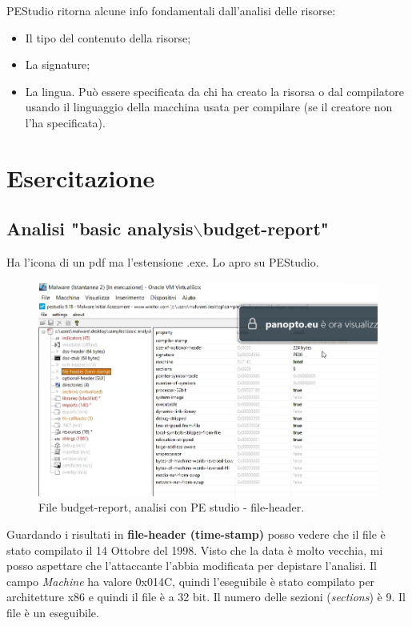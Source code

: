 \documentclass[a4paper]{book}
\begin{document}
PEStudio ritorna alcune info fondamentali dall'analisi delle risorse:
\begin{itemize}
    \item Il tipo del contenuto della risorse;
    \item La signature;
    \item La lingua. Può essere specificata da chi ha creato la risorsa o dal compilatore usando il linguaggio della macchina usata per compilare (se il creatore non l'ha specificata).
\end{itemize}

\section{Esercitazione}

\subsection{Analisi "basic analysis$\backslash$budget-report"}

Ha l'icona di un pdf ma l'estensione .exe. Lo apro su PEStudio.

\begin{figure}[p]
    \includegraphics[width=1\textwidth]{images/13-10/2.png}
    \caption{File budget-report, analisi con PE studio - file-header.}
\end{figure}

Guardando i risultati in \textbf{file-header (time-stamp)} posso vedere che il file è stato compilato il 14 Ottobre del 1998. Visto che la data è molto vecchia, mi posso aspettare che l'attaccante l'abbia modificata per depistare l'analisi.
Il campo \textit{Machine} ha valore 0x014C, quindi l'eseguibile è stato compilato per architetture x86 e quindi il file è a 32 bit.
Il numero delle sezioni (\textit{sections}) è 9. Il file è un eseguibile. 
\end{document}
